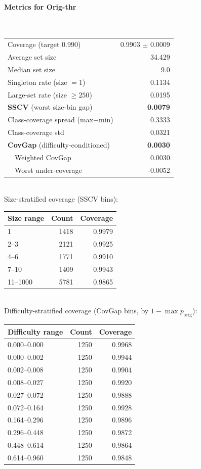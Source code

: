 \documentclass[parskip=half]{scrartcl}
\begin{document}
\paragraph{Metrics for Orig-thr}~\\
\begin{tabular}{l r}
\hline
Coverage (target 0.990) & 0.9903 $\pm$ 0.0009 \\
Average set size & 34.429 \\
Median set size & 9.0 \\
Singleton rate (size $=1$) & 0.1134 \\
Large-set rate (size $\geq 250$) & 0.0195 \\
\textbf{SSCV} (worst size-bin gap) & \textbf{0.0079} \\
Class-coverage spread (max$-$min) & 0.3333 \\
Class-coverage std & 0.0321 \\
\textbf{CovGap} (difficulty-conditioned) & \textbf{0.0030} \\
~~Weighted CovGap & 0.0030 \\
~~Worst under-coverage & -0.0052 \\
\hline
\end{tabular}\\[0.5em]
\textsf{\scriptsize Size-stratified coverage (SSCV bins):}\\
\begin{tabular}{l r r}
\hline
Size range & Count & Coverage \\
\hline
1 & 1418 & 0.9979 \\
2--3 & 2121 & 0.9925 \\
4--6 & 1771 & 0.9910 \\
7--10 & 1409 & 0.9943 \\
11--1000 & 5781 & 0.9865 \\
\hline
\end{tabular}\\[0.5em]
\textsf{\scriptsize Difficulty-stratified coverage (CovGap bins, by $1-\max p_{\mathrm{orig}}$):}\\
\begin{tabular}{l r r}
\hline
Difficulty range & Count & Coverage \\
\hline
0.000--0.000 & 1250 & 0.9968 \\
0.000--0.002 & 1250 & 0.9944 \\
0.002--0.008 & 1250 & 0.9904 \\
0.008--0.027 & 1250 & 0.9920 \\
0.027--0.072 & 1250 & 0.9888 \\
0.072--0.164 & 1250 & 0.9928 \\
0.164--0.296 & 1250 & 0.9896 \\
0.296--0.448 & 1250 & 0.9872 \\
0.448--0.614 & 1250 & 0.9864 \\
0.614--0.960 & 1250 & 0.9848 \\
\hline
\end{tabular}\\[0.5em]
\end{document}
